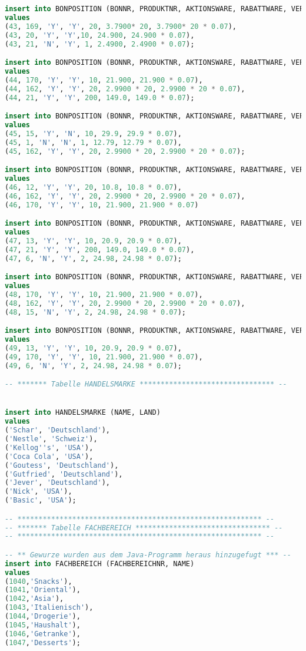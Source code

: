 \begin{lstlisting}[language=SQL]
insert into BONPOSITION (BONNR, PRODUKTNR, AKTIONSWARE, RABATTWARE, VERKAUFSMENGE, VERKAUFSPREIS, MWST)
values
(43, 169, 'Y', 'Y', 20, 3.7900* 20, 3.7900* 20 * 0.07),
(43, 20, 'Y', 'Y',10, 24.900, 24.900 * 0.07),
(43, 21, 'N', 'Y', 1, 2.4900, 2.4900 * 0.07);

insert into BONPOSITION (BONNR, PRODUKTNR, AKTIONSWARE, RABATTWARE, VERKAUFSMENGE, VERKAUFSPREIS, MWST)
values
(44, 170, 'Y', 'Y', 10, 21.900, 21.900 * 0.07),
(44, 162, 'Y', 'Y', 20, 2.9900 * 20, 2.9900 * 20 * 0.07),
(44, 21, 'Y', 'Y', 200, 149.0, 149.0 * 0.07);

insert into BONPOSITION (BONNR, PRODUKTNR, AKTIONSWARE, RABATTWARE, VERKAUFSMENGE, VERKAUFSPREIS, MWST)
values
(45, 15, 'Y', 'N', 10, 29.9, 29.9 * 0.07),
(45, 1, 'N', 'N', 1, 12.79, 12.79 * 0.07),
(45, 162, 'Y', 'Y', 20, 2.9900 * 20, 2.9900 * 20 * 0.07);

insert into BONPOSITION (BONNR, PRODUKTNR, AKTIONSWARE, RABATTWARE, VERKAUFSMENGE, VERKAUFSPREIS, MWST)
values
(46, 12, 'Y', 'Y', 20, 10.8, 10.8 * 0.07),
(46, 162, 'Y', 'Y', 20, 2.9900 * 20, 2.9900 * 20 * 0.07),
(46, 170, 'Y', 'Y', 10, 21.900, 21.900 * 0.07)

insert into BONPOSITION (BONNR, PRODUKTNR, AKTIONSWARE, RABATTWARE, VERKAUFSMENGE, VERKAUFSPREIS, MWST)
values
(47, 13, 'Y', 'Y', 10, 20.9, 20.9 * 0.07),
(47, 21, 'Y', 'Y', 200, 149.0, 149.0 * 0.07),
(47, 6, 'N', 'Y', 2, 24.98, 24.98 * 0.07);

insert into BONPOSITION (BONNR, PRODUKTNR, AKTIONSWARE, RABATTWARE, VERKAUFSMENGE, VERKAUFSPREIS, MWST)
values
(48, 170, 'Y', 'Y', 10, 21.900, 21.900 * 0.07),
(48, 162, 'Y', 'Y', 20, 2.9900 * 20, 2.9900 * 20 * 0.07),
(48, 15, 'N', 'Y', 2, 24.98, 24.98 * 0.07);

insert into BONPOSITION (BONNR, PRODUKTNR, AKTIONSWARE, RABATTWARE, VERKAUFSMENGE, VERKAUFSPREIS, MWST)
values
(49, 13, 'Y', 'Y', 10, 20.9, 20.9 * 0.07),
(49, 170, 'Y', 'Y', 10, 21.900, 21.900 * 0.07),
(49, 6, 'N', 'Y', 2, 24.98, 24.98 * 0.07);

-- ******* Tabelle HANDELSMARKE ******************************** --


insert into HANDELSMARKE (NAME, LAND)
values
('Schar', 'Deutschland'),
('Nestle', 'Schweiz'),
('Kellog''s', 'USA'),
('Coca Cola', 'USA'),
('Goutess', 'Deutschland'),
('Gutfried', 'Deutschland'),
('Jever', 'Deutschland'),
('Nick', 'USA'),
('Basic', 'USA');

-- ********************************************************** --
-- ******* Tabelle FACHBEREICH ******************************** --
-- ********************************************************** --

-- ** Gewurze wurden aus dem Java-Programm heraus hinzugefugt *** --
insert into FACHBEREICH (FACHBEREICHNR, NAME)
values
(1040,'Snacks'),
(1041,'Oriental'),
(1042,'Asia'),
(1043,'Italienisch'),
(1044,'Drogerie'),
(1045,'Haushalt'),
(1046,'Getranke'),
(1047,'Desserts');


\end{lstlisting}

